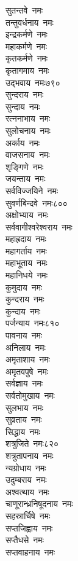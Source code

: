 \begin{multicols}{2}
\begin{flushleft}
सुतन्तवे~नमः\\
तन्तुवर्धनाय~नमः\\
इन्द्रकर्मणे~नमः\\
महाकर्मणे~नमः\\
कृतकर्मणे~नमः\\
कृतागमाय~नमः\\
उद्भवाय~नमः\hfill ७९०\\
सुन्दराय~नमः\\
सुन्दाय~नमः\\
रत्ननाभाय~नमः\\
सुलोचनाय~नमः\\
अर्काय~नमः\\
वाजसनाय~नमः\\
शृङ्गिणे~नमः\\
जयन्ताय~नमः\\
सर्वविज्जयिने~नमः\\
सुवर्णबिन्दवे~नमः\hfill ८००\\
अक्षोभ्याय~नमः\\
सर्ववागीश्वरेश्वराय~नमः\\
महाह्रदाय~नमः\\
महागर्ताय~नमः\\
महाभूताय~नमः\\
महानिधये~नमः\\
कुमुदाय~नमः\\
कुन्दराय~नमः\\
कुन्दाय~नमः\\
पर्जन्याय~नमः\hfill ८१०\\
पावनाय~नमः\\
अनिलाय~नमः\\
अमृताशाय~नमः\\
अमृतवपुषे~नमः\\
सर्वज्ञाय~नमः\\
सर्वतोमुखाय~नमः\\
सुलभाय~नमः\\
सुव्रताय~नमः\\
सिद्धाय~नमः\\
शत्रुजिते~नमः\hfill ८२०\\
शत्रुतापनाय~नमः\\
न्यग्रोधाय~नमः\\
उदुम्बराय~नमः\\
अश्वत्थाय~नमः\\
चाणूरान्ध्रनिषूदनाय~नमः\\
सहस्रार्चिषे~नमः\\
सप्तजिह्वाय~नमः\\
सप्तैधसे~नमः\\
सप्तवाहनाय~नमः\\

\end{flushleft}
\end{multicols}
